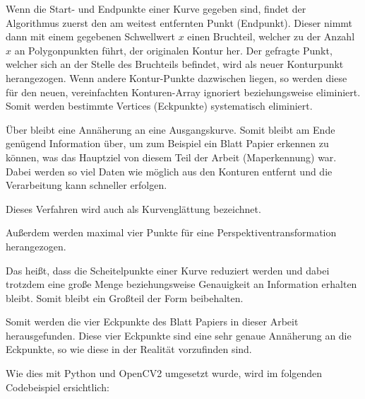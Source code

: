 Wenn die Start- und Endpunkte einer Kurve gegeben sind, findet der Algorithmus zuerst den am weitest entfernten Punkt (Endpunkt). Dieser nimmt dann mit einem gegebenen Schwellwert \(x\) einen Bruchteil, welcher zu der Anzahl \(x\) an Polygonpunkten führt, der originalen Kontur her. Der gefragte Punkt, welcher sich an der Stelle des Bruchteils befindet, wird als neuer Konturpunkt herangezogen. Wenn andere Kontur-Punkte dazwischen liegen, so werden diese für den neuen, vereinfachten Konturen-Array ignoriert beziehungsweise eliminiert. Somit werden bestimmte Vertices (Eckpunkte) systematisch eliminiert.

Über bleibt eine Annäherung an eine Ausgangskurve. Somit bleibt am Ende genügend Information über, um zum Beispiel ein Blatt Papier erkennen zu können, was das Hauptziel von diesem Teil der Arbeit (Maperkennung) war. Dabei werden so viel Daten wie möglich aus den Konturen entfernt und die Verarbeitung kann schneller erfolgen.

Dieses Verfahren wird auch als Kurvenglättung bezeichnet.

Außerdem werden maximal vier Punkte für eine Perspektiventransformation herangezogen.

Das heißt, dass die Scheitelpunkte einer Kurve reduziert werden und dabei trotzdem eine große Menge beziehungsweise Genauigkeit an Information erhalten bleibt. Somit bleibt ein Großteil der Form beibehalten.

Somit werden die vier Eckpunkte des Blatt Papiers in dieser Arbeit herausgefunden. Diese vier Eckpunkte sind eine sehr genaue Annäherung an die Eckpunkte, so wie diese in der Realität vorzufinden sind.

Wie dies mit Python und OpenCV2 umgesetzt wurde, wird im folgenden Codebeispiel ersichtlich:


